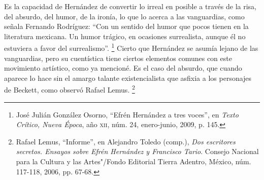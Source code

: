 \documentclass[14pt,twoside,final]{extbook} %
\let\oldfootnote\footnote
\renewcommand\footnote[1]{%
\oldfootnote{\hspace{1mm}#1}}
\begin{document}
Es la capacidad de Hernández de convertir lo irreal en posible a través de la risa, del absurdo, del humor, de la ironía, lo que lo acerca a las vanguardias, como señala Fernando Rodríguez: ``Con un sentido del humor que pocos tienen en la literatura mexicana. Un humor trágico, en ocasiones surrealista, aunque él no estuviera a favor del surrealismo''.\footnote{José Julián González Osorno, ``Efrén Hernández a tres voces'', en \emph{Texto Crítico, Nueva Época}, año \textsc{xii}, núm. 24, enero-junio, 2009, p. 145.} Cierto que Hernández se asumía lejano de las vanguardias, pero su cuentística tiene ciertos elementos comunes con este movimiento artístico, como ya mencioné. Es el caso del absurdo, que cuando aparece lo hace sin el amargo talante existencialista que asfixia a los personajes de Beckett, como observó Rafael Lemus.\footnote{Rafael Lemus, ``Informe'', en Alejandro Toledo (comp.), \emph{Dos escritores secretos. Ensayos sobre Efrén Hernández y Francisco Tario}. Consejo Nacional para la Cultura y las Artes"/Fondo Editorial Tierra Adentro, México, núm. 117-118, 2006, pp. 67-68.}
\end{document}
